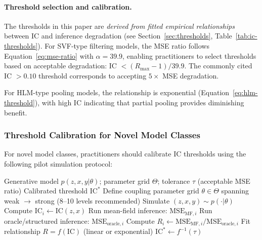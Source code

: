 \documentclass[10pt]{article} %
\theoremstyle{plain}
\theoremstyle{definition}
\newcommand{\IC}{\mathrm{IC}}  %
\begin{document}
\paragraph{Threshold selection and calibration.} The thresholds in this paper are \emph{derived from fitted empirical relationships} between IC and inference degradation (see Section~\ref{sec:thresholds}, Table~\ref{tab:ic-thresholds}). For SVF-type filtering models, the MSE ratio follows Equation~\ref{eq:mse-ratio} with $\alpha = 39.9$, enabling practitioners to select thresholds based on acceptable degradation: IC $< (R_{\max} - 1)/39.9$. The commonly cited IC $> 0.10$ threshold corresponds to accepting $5\times$ MSE degradation.

For HLM-type pooling models, the relationship is exponential (Equation~\ref{eq:hlm-threshold}), with high IC indicating that partial pooling provides diminishing benefit.

\subsubsection{Threshold Calibration for Novel Model Classes}

For novel model classes, practitioners should calibrate IC thresholds using the following pilot simulation protocol:

\begin{algorithm}[H]
\caption{IC Threshold Calibration for Novel Model Classes}
\label{alg:calibration}
\begin{algorithmic}[1]
\Require Generative model $p(z, x, y | \theta)$; parameter grid $\Theta$; tolerance $\tau$ (acceptable MSE ratio)
\Ensure Calibrated threshold $\IC^*$
\State Define coupling parameter grid $\theta \in \Theta$ spanning weak $\to$ strong (8--10 levels recommended)
     
        \State Simulate $(z, x, y) \sim p(\cdot | \theta)$
        \State Compute $\IC_i \gets \IC(z, x)$
        \State Run mean-field inference: $\text{MSE}_{\text{MF},i}$
        \State Run oracle/structured inference: $\text{MSE}_{\text{oracle},i}$
        \State Compute $R_i \gets \text{MSE}_{\text{MF},i} / \text{MSE}_{\text{oracle},i}$
    \EndFor
\EndFor
\State Fit relationship $R = f(\IC)$ (linear or exponential)
\State $\IC^* \gets f^{-1}(\tau)$
\end{algorithmic}
\end{algorithm}
\end{document}
